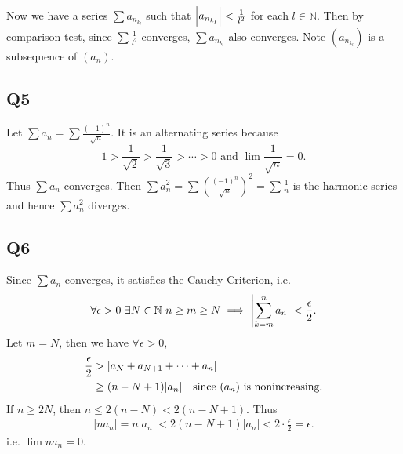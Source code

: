 \documentclass[12pt,lettersize]{article}
\newcommand{\N}{\mathbb{N}}
\begin{document}
	Now we have a series $\sum a_{n_{k_{l}}}$ such that $\abs{a_{n_{k_l}}}<\frac{1}{l^2}$ for each $l\in\N$. Then by comparison test, since $\sum\frac{1}{l^2}$ converges, $\sum a_{n_{k_l}}$ also converges. Note $(a_{n_{k_l}})$ is a subsequence of $(a_n)$.
	\newpage
	
	\subsection*{Q5}
	Let $\sum a_n=\sum\frac{(-1)^n}{\sqrt{n}}$. It is an alternating series because 
	\begin{displaymath}
		1>\frac{1}{\sqrt{2}}>\frac{1}{\sqrt{3}}>\cdots>0\text{ and }\lim\frac{1}{\sqrt{n}}=0.
	\end{displaymath}
	Thus $\sum a_n$ converges. Then $\sum a_n^2=\sum(\frac{(-1)^n}{\sqrt{n}})^2=\sum \frac{1}{n}$ is the harmonic series and hence $\sum a_n^2$ diverges.
	\newpage
	
	\subsection*{Q6}
	Since $\sum a_n$ converges, it satisfies the Cauchy Criterion, i.e.
	\begin{displaymath}
		\forall\epsilon>0\ \exists N\in\N\ n\geq m\geq N\implies \abs{\sum_{k=m}^{n}a_n}<\frac{\epsilon}{2}.
	\end{displaymath}
	Let $m=N$, then we have $\forall\epsilon>0$,
	\begin{align*}
		\frac{\epsilon}{2} &> \abs{a_N+a_{N+1}+\cdots+a_n}\\
				 &\geq (n-N+1)\abs{a_n}\quad\text{since $(a_n)$ is nonincreasing.}
	\end{align*}
	If $n\geq 2N$, then $n\leq 2(n-N)<2(n-N+1)$. Thus
	\begin{align*}
		|na_n|=n|a_n|<2(n-N+1)|a_n|<2\cdot\frac{\epsilon}{2}=\epsilon.
	\end{align*}
	i.e. $\lim na_n=0$.
	\newpage
	
\end{document}
